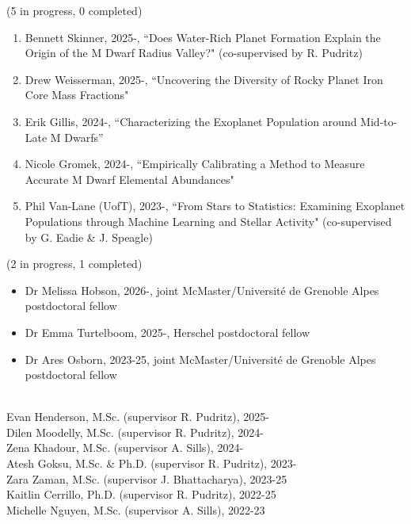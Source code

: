 \documentclass[12pt]{article}
\begin{document}
 (5 in progress, 0 completed)
\begin{enumerate}[noitemsep]
\item Bennett Skinner, 2025-, ``Does Water-Rich Planet Formation Explain the Origin of the M Dwarf Radius Valley?" (co-supervised by R. Pudritz)
\item Drew Weisserman, 2025-, ``Uncovering the Diversity of Rocky Planet Iron Core Mass Fractions"
\item Erik Gillis, 2024-, ``Characterizing the Exoplanet Population around Mid-to-Late M Dwarfs''
\item Nicole Gromek, 2024-, ``Empirically Calibrating a Method to Measure Accurate M Dwarf Elemental Abundances"
\item Phil Van-Lane (UofT), 2023-, ``From Stars to Statistics: Examining Exoplanet Populations through Machine Learning and Stellar Activity" (co-supervised by G. Eadie \& J. Speagle)
\end{enumerate}

 (2 in progress, 1 completed)
\begin{itemize}[noitemsep]
\item[-] Dr Melissa Hobson, 2026-, joint McMaster/Université de Grenoble Alpes postdoctoral fellow
\item[-] Dr Emma Turtelboom, 2025-, Herschel postdoctoral fellow
\item[-] Dr Ares Osborn, 2023-25, joint McMaster/Université de Grenoble Alpes postdoctoral fellow
\end{itemize}


\\
Evan Henderson, M.Sc. (supervisor R. Pudritz), 2025-\\
Dilen Moodelly, M.Sc. (supervisor R. Pudritz), 2024-\\
Zena Khadour, M.Sc. (supervisor A. Sills), 2024-\\
Atesh Goksu, M.Sc. \& Ph.D. (supervisor R. Pudritz), 2023-\\
Zara Zaman, M.Sc. (supervisor J. Bhattacharya), 2023-25\\
Kaitlin Cerrillo, Ph.D. (supervisor R. Pudritz), 2022-25\\
Michelle Nguyen, M.Sc. (supervisor A. Sills), 2022-23\\
\end{document}
